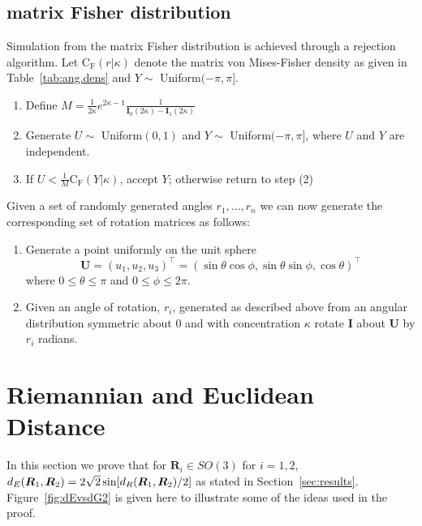 \subsection{matrix Fisher distribution}%

Simulation from the matrix Fisher distribution is achieved through a rejection algorithm.  Let  $\mathrm{C_F}(r|\kappa)$ denote the matrix von Mises-Fisher density as given in Table~\ref{tab:ang.dens} and $Y\sim$ Uniform$(-\pi,\pi]$.

\begin{enumerate}
\item Define $M=\frac{1}{2\kappa}e^{2\kappa - 1}\frac{1}{\mathbf{I}_0(2\kappa)-\mathbf{I}_1(2\kappa)}$
\item Generate $U\sim$ Uniform$(0,1)$ and $Y\sim$ Uniform$(-\pi,\pi]$, where $U$ and $Y$ are independent.
\item If $U<\frac{1}{M}\mathrm{C_F}(Y|\kappa)$, accept $Y$; otherwise return to step (2)
\end{enumerate}

Given a set of randomly generated angles $r_1,\ldots, r_n$ we can now generate the corresponding set of rotation matrices as follows:
\begin{enumerate}
\item Generate a point uniformly on the unit sphere
$$\bm{U}=(u_1,u_2,u_3)^\top=(\sin\theta\cos\phi,\sin\theta\sin\phi,\cos\theta)^\top$$
where  $0\leq \theta\leq \pi$ and $0\leq \phi\leq 2\pi$.
\item Given an angle of rotation, $r_i$, generated as described above from an angular distribution symmetric about 0 and with concentration $\kappa$ rotate $\bm{I}$ about $\bm{U}$ by $r_i$ radians.
\end{enumerate}

\section{Riemannian and Euclidean Distance}
\label{sec:appendix2}
In this section we prove that for $\bm R_i\in SO(3)$ for $i=1,2$, ${d_E}(\bm R_1,\bm R_2)=2\sqrt{2}\sin[{d_R}(\bm R_1,\bm R_2)/2]$ as stated in Section~\ref{sec:results}.  Figure~\ref{fig:dEvsdG2} is given here to illustrate some of the ideas used in the proof.


